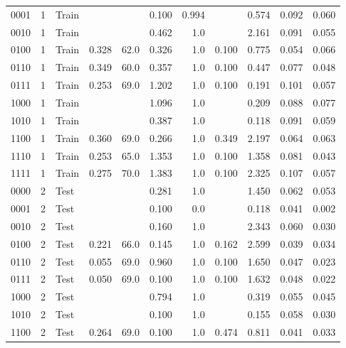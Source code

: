\begin{longtable}{lllrrrrrrrr}
   0001 &       1 &   Train &       &     &     0.100 & 0.994 &    &          0.574 & 0.092 & 0.060 \\
   0010 &       1 &   Train &       &     &     0.462 & 1.0 &    &          2.161 & 0.091 & 0.055 \\
   0100 &       1 &   Train &    0.328 & 62.0 &     0.326 & 1.0 & 0.100 &          0.775 & 0.054 & 0.066 \\
   0110 &       1 &   Train &    0.349 & 60.0 &     0.357 & 1.0 & 0.100 &          0.447 & 0.077 & 0.048 \\
   0111 &       1 &   Train &    0.253 & 69.0 &     1.202 & 1.0 & 0.100 &          0.191 & 0.101 & 0.057 \\
   1000 &       1 &   Train &       &     &     1.096 & 1.0 &    &          0.209 & 0.088 & 0.077 \\
   1010 &       1 &   Train &       &     &     0.387 & 1.0 &    &          0.118 & 0.091 & 0.059 \\
   1100 &       1 &   Train &    0.360 & 69.0 &     0.266 & 1.0 & 0.349 &          2.197 & 0.064 & 0.063 \\
   1110 &       1 &   Train &    0.253 & 65.0 &     1.353 & 1.0 & 0.100 &          1.358 & 0.081 & 0.043 \\
   1111 &       1 &   Train &    0.275 & 70.0 &     1.383 & 1.0 & 0.100 &          2.325 & 0.107 & 0.057 \\
   0000 &       2 &  Test &       &     &     0.281 & 1.0 &    &          1.450 & 0.062 & 0.053 \\
   0001 &       2 &  Test &       &     &     0.100 & 0.0 &    &          0.118 & 0.041 & 0.002 \\
   0010 &       2 &  Test &       &     &     0.160 & 1.0 &    &          2.343 & 0.060 & 0.030 \\
   0100 &       2 &  Test &    0.221 & 66.0 &     0.145 & 1.0 & 0.162 &          2.599 & 0.039 & 0.034 \\
   0110 &       2 &  Test &    0.055 & 69.0 &     0.960 & 1.0 & 0.100 &          1.650 & 0.047 & 0.023 \\
   0111 &       2 &  Test &    0.050 & 69.0 &     0.100 & 1.0 & 0.100 &          1.632 & 0.048 & 0.022 \\
   1000 &       2 &  Test &       &     &     0.794 & 1.0 &    &          0.319 & 0.055 & 0.045 \\
   1010 &       2 &  Test &       &     &     0.100 & 1.0 &    &          0.155 & 0.058 & 0.030 \\
   1100 &       2 &  Test &    0.264 & 69.0 &     0.100 & 1.0 & 0.474 &          0.811 & 0.041 & 0.033 \\

\end{longtable}
